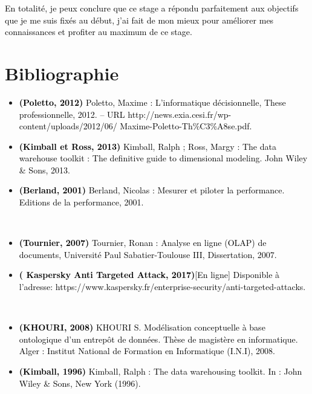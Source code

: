 \documentclass[a4paper,12pt]{report}
\begin{document}
\textcolor{black}{En totalité, je peux conclure que ce stage a répondu parfaitement aux objectifs que je me suis fixés au début, j’ai fait de mon mieux pour améliorer mes connaissances et profiter au maximum de ce stage.}	



\chapter*{Bibliographie}
\begin{itemize}

	\item[] \textcolor{black}{
\textbf{(Poletto, 2012)} Poletto, Maxime : L’informatique décisionnelle, These professionnelle, 2012. – URL http://news.exia.cesi.fr/wp-content/uploads/2012/06/
Maxime-Poletto-Th\%C3\%A8se.pdf.	
}
~~\\

	\item[] \textcolor{black}{
\textbf{(Kimball et Ross, 2013)} Kimball, Ralph ; Ross, Margy : The data warehouse toolkit : The definitive guide to dimensional modeling. John Wiley \& Sons, 2013.	
}
~~\\

	\item[] \textcolor{black}{
\textbf{(Berland, 2001)} Berland, Nicolas : Mesurer et piloter la performance. Editions de la 	performance, 2001.}

~~\\

	\item[] \textcolor{black}{
\textbf{(Tournier, 2007)} Tournier, Ronan : Analyse en ligne (OLAP) de documents, Université Paul Sabatier-Toulouse III, Dissertation, 2007.	
}
~~\\


\item[] \textcolor{black}{
\textbf{( Kaspersky Anti Targeted Attack, 2017)}[En ligne] Disponible à l'adresse: https://www.kaspersky.fr/enterprise-security/anti-targeted-attacks.
}

~~\\
	\item[] \textcolor{black}{
\textbf{(KHOURI, 2008)} KHOURI S. Modélisation conceptuelle à base ontologique d’un entrepôt de données. Thèse de magistère en informatique. Alger : Institut National de Formation en Informatique (I.N.I), 2008.	
}
~~\\
	\item[] \textcolor{black}{
\textbf{ (Kimball, 1996)} Kimball, Ralph : The data warehousing toolkit.
 In : John Wiley \& Sons, New York (1996).	
}
~~\\


\end{itemize}
\end{document}

